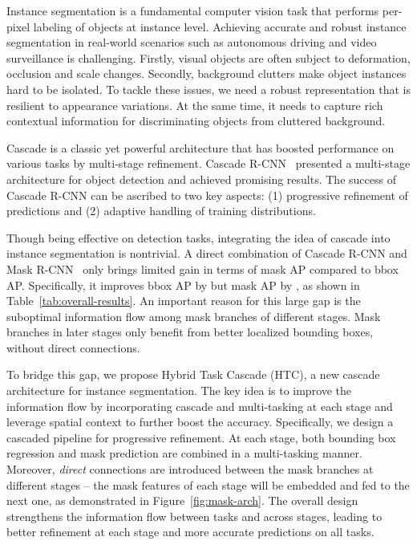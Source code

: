 \documentclass[10pt,twocolumn,letterpaper]{article}
\begin{document}
Instance segmentation is a fundamental computer vision task that performs
per-pixel labeling of objects at instance level. Achieving accurate and robust
instance segmentation in real-world scenarios such as autonomous driving and
video surveillance is challenging.
Firstly, visual objects are often subject to deformation, occlusion and scale
changes. Secondly, background clutters make object instances hard to be
isolated. To tackle these issues, we need a robust representation that is
resilient to appearance variations. At the same time, it needs to capture rich
contextual information for discriminating objects from cluttered background.

Cascade is a classic yet powerful architecture that has boosted performance on
various tasks by multi-stage refinement. Cascade R-CNN~\cite{cai18cascadercnn}
presented a multi-stage architecture for object detection and achieved promising
results. The success of Cascade R-CNN can be ascribed to two key aspects:
(1) progressive refinement of predictions and
(2) adaptive handling of training distributions.

Though being effective on detection tasks, integrating the idea of cascade into
instance segmentation is nontrivial. A direct combination of Cascade R-CNN and
Mask R-CNN~\cite{he2017mask} only brings limited gain in terms of mask AP
compared to bbox AP. Specifically, it improves bbox AP by  but mask AP by
, as shown in Table~\ref{tab:overall-results}. An important reason for
this large gap is the suboptimal information flow among mask branches of
different stages. Mask branches in later stages only benefit from better
localized bounding boxes, without direct connections.

To bridge this gap, we propose Hybrid Task Cascade (HTC),
a new cascade architecture for instance segmentation.
The key idea is to improve the information flow by incorporating cascade and
multi-tasking at each stage and leverage spatial context to further boost the
accuracy.
Specifically, we design a cascaded pipeline for progressive refinement.
At each stage, both bounding box regression and mask prediction
are combined in a multi-tasking manner.
Moreover, \emph{direct} connections are introduced between the mask branches
at different stages -- the mask features of each stage will be embedded and
fed to the next one, as demonstrated in Figure~\ref{fig:mask-arch}.
The overall design strengthens the information flow between tasks and
across stages, leading to better refinement at each stage and more accurate
predictions on all tasks.
\end{document}
